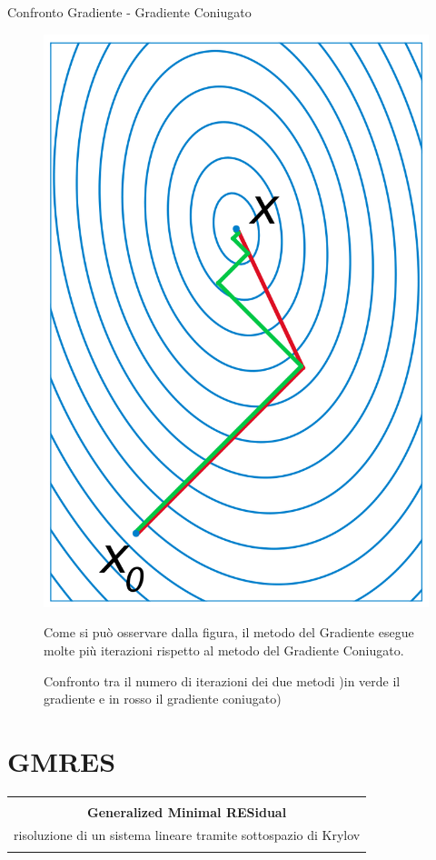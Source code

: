 \documentclass[10pt]{beamer}
\begin{document}
\begin{frame}{Confronto Gradiente - Gradiente Coniugato}
    \begin{figure}
    \centering
    \includegraphics[width=.35\linewidth]{cg_comp.png}
    \caption{Confronto tra il numero di iterazioni dei due metodi )in verde il gradiente e in rosso il gradiente coniugato)}
Come si può osservare dalla figura, il metodo del Gradiente esegue molte più iterazioni rispetto al  metodo del Gradiente Coniugato. 
\end{figure}
\end{frame}

\section{GMRES}\label{sec:sec3}


\begin{frame} 
\begin{center}
\begin{tabular}{ c }
\hline\\
\textbf{Generalized Minimal RESidual} \\ [0.5ex]
risoluzione di un sistema lineare tramite sottospazio di Krylov\\ \\
 \hline
\end{tabular}
\end{center}
\end{frame}
\end{document}
